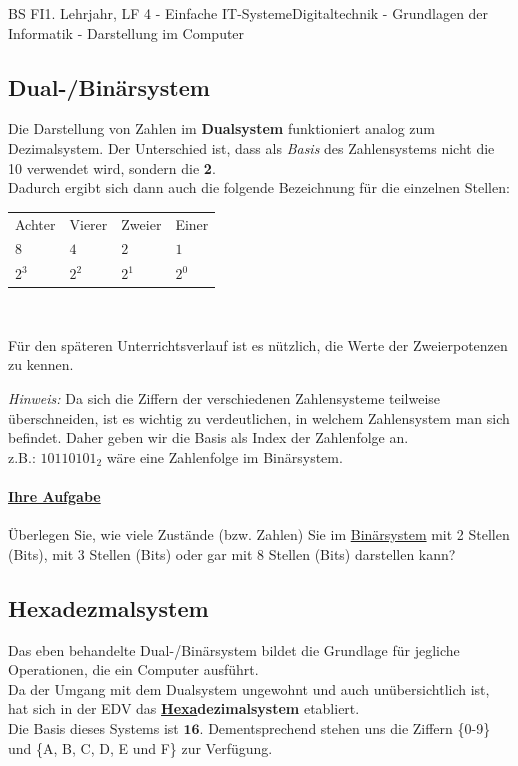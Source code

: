 \documentclass[11pt,twocolumn,oneside,openany,headings=optiontotoc,11pt,numbers=noenddot]{article}
\begin{document}
\begin{worksheet}{BS FI}{1. Lehrjahr, LF 4 - Einfache IT-Systeme}{Digitaltechnik - Grundlagen der Informatik - Darstellung im Computer}
		\subsection*{Dual-/Binärsystem}
		Die Darstellung von Zahlen im \textbf{Dualsystem} funktioniert analog zum Dezimalsystem. Der Unterschied ist, dass als \textit{Basis} des Zahlensystems nicht die 10 verwendet wird, sondern die \textbf{2}.\\
		Dadurch ergibt sich dann auch die folgende Bezeichnung für die einzelnen Stellen:\\
		\par\noindent
		\begin{tabularx}{0.48\textwidth}{MMMM}
			\grqq{}Achter\grqq{} & \grqq{}Vierer\grqq{} & \grqq{}Zweier\grqq{} & \grqq{}Einer\grqq{}\\
			\(8\) & \(4\) & \(2\) & \(1\)\\
			\(2^3\) & \(2^2\) & \(2^1\) & \(2^0\)
		\end{tabularx}\\
		\par\noindent
		Für den späteren Unterrichtsverlauf ist es nützlich, die Werte der Zweierpotenzen zu kennen.
		\par\noindent
		\textit{Hinweis:} Da sich die Ziffern der verschiedenen Zahlensysteme teilweise überschneiden, ist es wichtig zu verdeutlichen, in welchem Zahlensystem man sich befindet. Daher geben wir die Basis als Index der Zahlenfolge an.\\
		z.B.: \(10110101_2\) wäre eine Zahlenfolge im Binärsystem.\\
		\paragraph{\underline{Ihre Aufgabe}} Überlegen Sie, wie viele Zustände (bzw. Zahlen) Sie im \underline{Binärsystem} mit 2 Stellen (Bits), mit 3 Stellen (Bits) oder gar mit 8 Stellen (Bits) darstellen kann?
		\subsection*{Hexadezmalsystem} Das eben behandelte Dual-/Binärsystem bildet die Grundlage für jegliche Operationen, die ein Computer ausführt.\\
		Da der Umgang mit dem Dualsystem ungewohnt und auch unübersichtlich ist, hat sich in der EDV das \textbf{\underline{Hexa}dezimalsystem} etabliert.\\
		Die Basis dieses Systems ist \(\mathbf{16}\). Dementsprechend stehen uns die Ziffern \{0-9\} und \{A, B, C, D, E und F\} zur Verfügung.

\end{worksheet}
\end{document}
